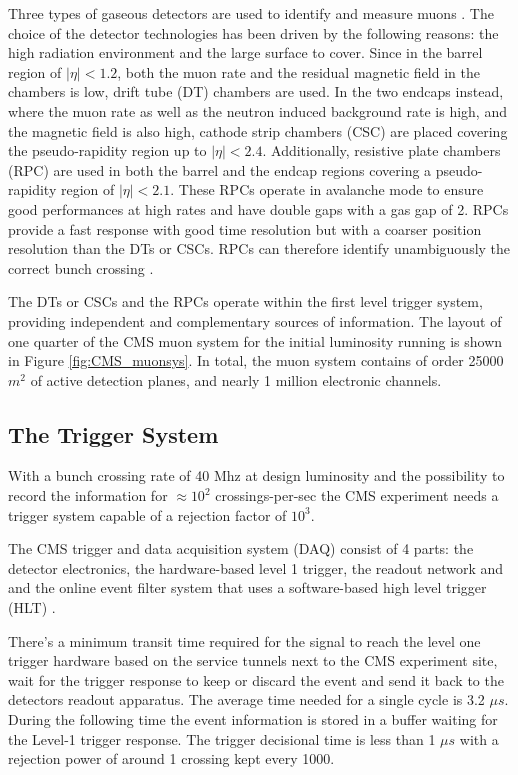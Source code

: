 Three types of gaseous detectors are used to identify and measure muons \cite{CMS:1997dma}. The choice of the detector technologies has been driven by the following reasons: the high radiation environment and the large surface to cover. Since in the barrel region of $|\eta| < 1.2$, both the muon rate and the residual magnetic field in the chambers is low, drift tube (DT) chambers are used. In the two endcaps instead, where the muon rate as well as the neutron induced background rate is high, and the magnetic ﬁeld is also high, cathode strip chambers (CSC) are placed covering the pseudo-rapidity region up to $|\eta| < 2.4$. Additionally, resistive plate chambers (RPC) are used in both the barrel and the endcap regions covering a pseudo-rapidity region of $|\eta| < 2.1$. These RPCs operate in avalanche mode to ensure good performances at high rates and have double gaps with a gas gap of 2\mm. RPCs provide a fast response with good time resolution but with a coarser position resolution than the DTs or CSCs. RPCs can therefore identify unambiguously the correct bunch crossing \cite{Chatrchyan:2009hg}.

The DTs or CSCs and the RPCs operate within the first level trigger system, providing independent and complementary sources of information.
The layout of one quarter of the CMS muon system for the initial luminosity running is shown in Figure \ref{fig:CMS_muonsys}. In total, the muon system contains of order 25000 $m^{2}$ of active detection planes, and nearly 1 million electronic channels.

\clearpage

\subsection{The Trigger System}

With a bunch crossing rate of 40 Mhz at design luminosity and the possibility to record the information for $\approx 10^{2}$ crossings-per-sec the CMS experiment needs a trigger system capable of a rejection factor of $10^{3}$.

The CMS trigger and data acquisition system (DAQ) consist of 4 parts: the detector electronics, the hardware-based level 1 trigger, the readout network and and the online event filter system that uses a software-based high level trigger (HLT) \cite{bib:cmstdr:trigger}.

There's a minimum transit time required for the signal to reach the level one trigger hardware based on the service tunnels next to the CMS experiment site, wait for the trigger response to keep or discard the event and send it back to the detectors readout apparatus. The average time needed for a single cycle is 3.2 $\mu s$. During the following time the event information is stored in a buffer waiting for the Level-1 trigger response. The trigger decisional time is less than 1 $\mu s$ with a rejection power of around 1 crossing kept every 1000.

